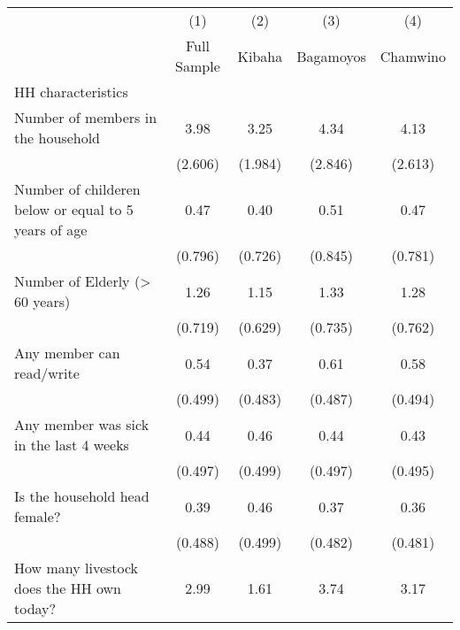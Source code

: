 {
\def\sym#1{\ifmmode^{#1}\else\(^{#1}\)\fi}
\begin{tabular}{l*{4}{c}}
\hline\hline
                    &\multicolumn{1}{c}{(1)}&\multicolumn{1}{c}{(2)}&\multicolumn{1}{c}{(3)}&\multicolumn{1}{c}{(4)}\\
                    &\multicolumn{1}{c}{Full Sample}&\multicolumn{1}{c}{ Kibaha}&\multicolumn{1}{c}{Bagamoyos}&\multicolumn{1}{c}{Chamwino}\\
\hline
HH characteristics  &                     &                     &                     &                     \\
[1em]
Number of members in the household&        3.98         &        3.25         &        4.34         &        4.13         \\
                    &     (2.606)         &     (1.984)         &     (2.846)         &     (2.613)         \\
[1em]
Number of childeren below or equal to 5 years of age&        0.47         &        0.40         &        0.51         &        0.47         \\
                    &     (0.796)         &     (0.726)         &     (0.845)         &     (0.781)         \\
[1em]
Number of Elderly (> 60 years)&        1.26         &        1.15         &        1.33         &        1.28         \\
                    &     (0.719)         &     (0.629)         &     (0.735)         &     (0.762)         \\
[1em]
Any member can read/write&        0.54         &        0.37         &        0.61         &        0.58         \\
                    &     (0.499)         &     (0.483)         &     (0.487)         &     (0.494)         \\
[1em]
Any member was sick in the last 4 weeks&        0.44         &        0.46         &        0.44         &        0.43         \\
                    &     (0.497)         &     (0.499)         &     (0.497)         &     (0.495)         \\
[1em]
Is the household head female?&        0.39         &        0.46         &        0.37         &        0.36         \\
                    &     (0.488)         &     (0.499)         &     (0.482)         &     (0.481)         \\
[1em]
How many livestock does the HH own today?&        2.99         &        1.61         &        3.74         &        3.17         \\

\end{tabular}}
